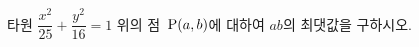 타원 $\dfrac{x^2}{25}+\dfrac{y^2}{16}=1$ 위의 점~$\mathrm{P}(a{,}\mkern3mu\mathopen{}b)$에 대하여 $ab$의 최댓값을 구하시오. 

